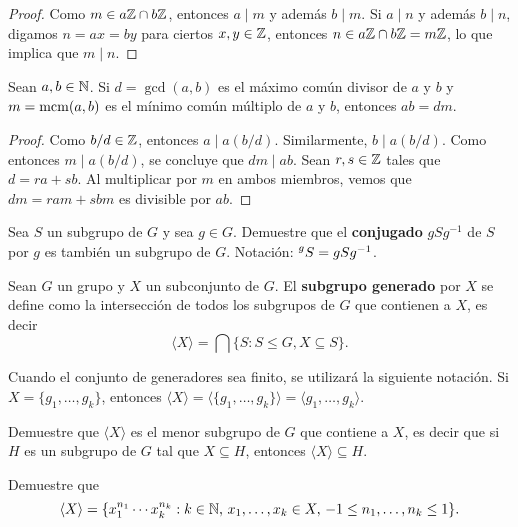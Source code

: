 \begin{proof}
    Como $m\in a\mathbb{Z}\cap b\mathbb{Z}$, entonces $a\mid m$ y además $b\mid m$. Si $a\mid n$ y además $b\mid n$, digamos $n=ax=by$ para ciertos $x,y\in\mathbb{Z}$, 
    entonces $n\in a\mathbb{Z}\cap b\mathbb{Z}=m\mathbb{Z}$, lo que implica que $m\mid n$. 
\end{proof}

\begin{proposition}
Sean $a,b\in\mathbb{N}$. Si $d=\gcd(a,b)$ es el máximo común divisor de $a$ y $b$ y $m=\operatorname{mcm}(a,b)$
es el mínimo común múltiplo de $a$ y $b$, entonces $ab=dm$.  	
\end{proposition}

\begin{proof}
Como $b/d\in\mathbb{Z}$, entonces $a\mid a(b/d)$. Similarmente, $b\mid a(b/d)$. Como entonces $m\mid a(b/d)$, se concluye que $dm\mid ab$. 
Sean $r,s\in\mathbb{Z}$ tales que $d=ra+sb$. Al multiplicar por $m$ en ambos miembros, vemos que $dm=ram+sbm$ es divisible por $ab$. 
\end{proof}

\begin{exercise}
	Sea $S$ un subgrupo de $G$ y sea $g\in G$. Demuestre que el \textbf{conjugado} $gSg^{-1}$ 
	de $S$ por $g$ es
	también un subgrupo de $G$. Notación: $\prescript{g}{}S=gSg^{-1}$. 
\end{exercise}

\begin{definition}
	Sean $G$ un grupo y $X$ un subconjunto de $G$. El \textbf{subgrupo
	generado} por $X$ se define como la intersección de todos los subgrupos de $G$ que contienen a $X$, es decir  
	\[
		\langle X\rangle=\bigcap\{S:S\leq G,X\subseteq S\}.
	\]
\end{definition}

Cuando el conjunto de generadores sea finito, se utilizará la siguiente notación. Si $X=\{g_1,\dots,g_k\}$, entonces $\langle
X\rangle=\langle\{g_1,\dots,g_k\}\rangle=\langle g_1,\dots,g_k\rangle$. 	

\begin{exercise}
Demuestre que $\langle
X\rangle$ es el menor subgrupo de $G$ que contiene a $X$, es decir que si $H$ es un subgrupo de $G$ tal que $X\subseteq H$, entonces $\langle X\rangle\subseteq H$.  
\end{exercise}

\begin{exercise}
Demuestre que 
\[
	\langle X\rangle=\{x_1^{n_1}\cdots x_k^{n_k}:k\in\mathbb{N},\,x_1,\dots,x_k\in X,\,-1\leq n_1,\dots,n_k\leq 1\}.
\]
\end{exercise}

